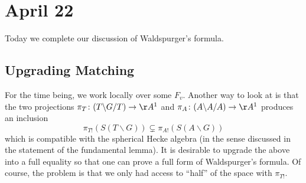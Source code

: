 \documentclass[../notes.tex]{subfiles}
\begin{document}
\section{April 22}
Today we complete our discussion of Waldspurger's formula.

\subsection{Upgrading Matching}
For the time being, we work locally over some $F_v$. Another way to look at  is that the two projections $\pi_T\colon(T\backslash G/T)\to\AA^1$ and $\pi_A\colon(A\backslash A/A)\to\AA^1$ produces an inclusion
\[\pi_{T!}(S(T\backslash G))\subsetneq\pi_{A!}(S(A\backslash G))\]
which is compatible with the spherical Hecke algebra (in the sense discussed in the statement of the fundamental lemma). It is desirable to upgrade the above into a full equality so that one can prove a full form of Waldspurger's formula. Of course, the problem is that we only had access to ``half'' of the space with $\pi_{T!}$.
\end{document}
